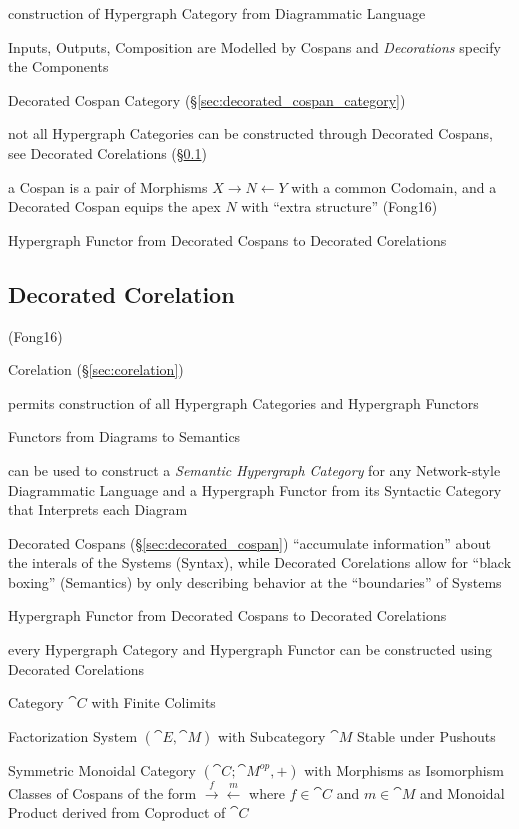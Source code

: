 construction of Hypergraph Category from Diagrammatic Language

Inputs, Outputs, Composition are Modelled by Cospans and
\emph{Decorations} specify the Components

Decorated Cospan Category (\S\ref{sec:decorated_cospan_category})

not all Hypergraph Categories can be constructed through Decorated
Cospans, see Decorated Corelations (\S\ref{sec:decorated_corelation})

a Cospan is a pair of Morphisms $X \rightarrow N \leftarrow Y$ with a
common Codomain, and a Decorated Cospan equips the apex $N$ with
``extra structure'' (Fong16) %

Hypergraph Functor from Decorated Cospans to Decorated Corelations



\subsection{Decorated Corelation}\label{sec:decorated_corelation}

(Fong16)

Corelation (\S\ref{sec:corelation})

permits construction of all Hypergraph Categories and Hypergraph
Functors

Functors from Diagrams to Semantics

can be used to construct a \emph{Semantic Hypergraph Category} for any
Network-style Diagrammatic Language and a Hypergraph Functor from its
Syntactic Category that Interprets each Diagram

Decorated Cospans (\S\ref{sec:decorated_cospan}) ``accumulate
information'' about the interals of the Systems (Syntax), while
Decorated Corelations allow for ``black boxing'' (Semantics) by only
describing behavior at the ``boundaries'' of Systems

Hypergraph Functor from Decorated Cospans to Decorated Corelations

every Hypergraph Category and Hypergraph Functor can be constructed
using Decorated Corelations

Category $\cat{C}$ with Finite Colimits

Factorization System $(\cat{E},\cat{M})$ with Subcategory $\cat{M}$
Stable under Pushouts

Symmetric Monoidal Category $(\cat{C};\cat{M}^{op}, +)$ with Morphisms
as Isomorphism Classes of Cospans of the form
$\xrightarrow{f}\xleftarrow{m}$ where $f \in \cat{C}$ and $m \in
\cat{M}$ and Monoidal Product derived from Coproduct of $\cat{C}$

